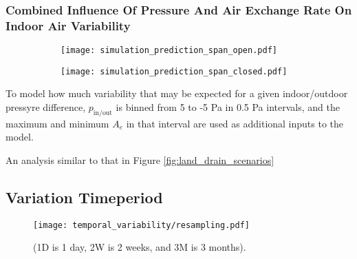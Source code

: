 \documentclass[journal=esthag,manuscript=article]{achemso}
\begin{document}
\subsubsection{Combined Influence Of Pressure And Air Exchange Rate On Indoor Air Variability}

\begin{figure}[htb!] %
  \caption{ }
  \label{fig:simulation_sampling}
  \begin{subfigure}{0.49\textwidth}
    \centering
    \caption{ }
    \label{fig:simulation_sampling_pp_open}
    \texttt{[image: simulation\_prediction\_span\_open.pdf]}
  \end{subfigure}
  \begin{subfigure}{0.49\textwidth}
    \centering
    \caption{ }
    \label{fig:simulation_sampling_pp_closed}
    \texttt{[image: simulation\_prediction\_span\_closed.pdf]}
  \end{subfigure}
\end{figure}

To model how much variability that may be expected for a given indoor/outdoor pressyre difference, $p_\mathrm{in/out}$ is binned from 5 to -5 Pa in 0.5 Pa intervals, and the maximum and minimum $A_e$ in that interval are used as additional inputs to the model. %


An analysis similar to that in Figure \ref{fig:land_drain_scenarios}



\subsection{Variation Timeperiod} %

\begin{figure}[htb!] %
  \centering
  \caption{ (1D is 1 day, 2W is 2 weeks, and 3M is 3 months).}
  \label{fig:resampling}
  \texttt{[image: temporal\_variability/resampling.pdf]}
\end{figure}
\end{document}
